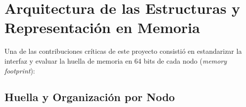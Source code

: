\documentclass[11pt,a4paper]{article}
\begin{document}
\section{Arquitectura de las Estructuras y Representación en Memoria}

Una de las contribuciones críticas de este proyecto consistió en estandarizar la interfaz y evaluar la huella de memoria en 64 bits de cada nodo (\textit{memory footprint}):

\subsection{Huella y Organización por Nodo}

\begin{table}[h!]
\centering
\small
\caption{Comparación de representación en memoria y punteros en arquitectura de 64 bits.}
\label{tab:memoria}
\end{table}
\end{document}
